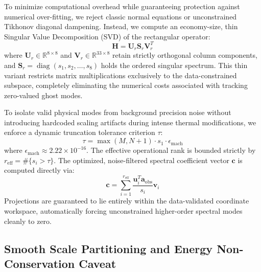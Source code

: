 To minimize computational overhead while guaranteeing protection against numerical over-fitting, we reject classic normal equations or unconstrained Tikhonov diagonal dampening. Instead, we compute an economy-size, thin Singular Value Decomposition (SVD) of the rectangular operator:
\begin{equation}
\mathbf{H} = \mathbf{U}_r \mathbf{S}_r \mathbf{V}_r^T
\label{eq:thin_svd}
\end{equation}
where $\mathbf{U}_r \in \mathbb{R}^{8 \times 8}$ and $\mathbf{V}_r \in \mathbb{R}^{33 \times 8}$ retain strictly orthogonal column components, and $\mathbf{S}_r = \operatorname{diag}(s_1, s_2, \ldots, s_8)$ holds the ordered singular spectrum. This thin variant restricts matrix multiplications exclusively to the data-constrained subspace, completely eliminating the numerical costs associated with tracking zero-valued ghost modes.

To isolate valid physical modes from background precision noise without introducing hardcoded scaling artifacts during intense thermal modifications, we enforce a dynamic truncation tolerance criterion $\tau$:
\begin{equation}
\tau = \max\left(M, N+1\right) \cdot s_1 \cdot \epsilon_{\mathrm{mach}}
\label{eq:dynamic_tolerance}
\end{equation}
where $\epsilon_{\mathrm{mach}} \approx 2.22 \times 10^{-16}$. The effective operational rank is bounded strictly by $r_{\mathrm{eff}} = \#\{s_i > \tau\}$. The optimized, noise-filtered spectral coefficient vector $\mathbf{c}$ is computed directly via:
\begin{equation}
\mathbf{c} = \sum_{i=1}^{r_{\mathrm{eff}}} \frac{\mathbf{u}_i^T \mathbf{a}_{\mathrm{obs}}}{s_i} \mathbf{v}_i
\label{eq:svd_reconstruction}
\end{equation}
Projections are guaranteed to lie entirely within the data-validated coordinate workspace, automatically forcing unconstrained higher-order spectral modes cleanly to zero.

\subsection{Smooth Scale Partitioning and Energy Non-Conservation Caveat}
\label{sec:methods:partition}

